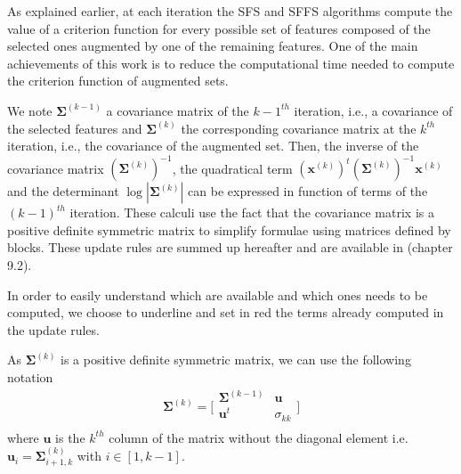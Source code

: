 \documentclass[a4paper,11pt,DIV=16]{scrartcl}
\begin{document}
        As explained earlier, at each iteration the SFS and SFFS algorithms compute the value of a criterion function for every possible set of features composed of the selected ones augmented by one of the remaining features. One of the main achievements of this work is to reduce the computational time needed to compute the criterion function of augmented sets.

        We note $\boldsymbol{\Sigma}^{(k-1)}$ a covariance matrix of the $k-1^{th}$ iteration, i.e., a covariance of the selected features and $\boldsymbol{\Sigma}^{(k)}$ the corresponding covariance matrix at the $k^{th}$ iteration, i.e., the covariance of the augmented set. Then, the inverse of the covariance matrix $(\boldsymbol{\Sigma}^{(k)})^{-1}$, the quadratical term $(\mathbf{x}^{(k)})^t (\boldsymbol{\Sigma}^{(k)})^{-1} \mathbf{x}^{(k)}$ and the determinant $\log |\boldsymbol{\Sigma}^{(k)}|$ can be expressed in function of terms of the $(k-1)^{th}$ iteration. These calculi use the fact that the covariance matrix is a positive definite symmetric matrix to simplify formulae using matrices defined by blocks. These update rules are summed up hereafter and are available in \cite{webb2003statistical} (chapter 9.2).

        In order to easily understand which are available and which ones needs to be computed, we choose to underline and set in red the terms already computed in the update rules.

        As $\boldsymbol{\Sigma}^{(k)}$ is a positive definite symmetric matrix, we can use the following notation
        \begin{equation*}
            \boldsymbol{\Sigma}^{(k)} =
            \bigg[\begin{array}{cc}
            \boldsymbol{\Sigma}^{(k-1)} & \mathbf{u}      \\
            \mathbf{u}^t          & \sigma_{kk} \\
            \end{array}\bigg]
        \end{equation*}
        where $\mathbf{u}$ is the $k^{th}$ column of the matrix without the diagonal element i.e. $\mathbf{u}_{i} = \boldsymbol{\Sigma}^{(k)}_{i+1,k}$ with $i \in [1,k-1]$.
\end{document}

